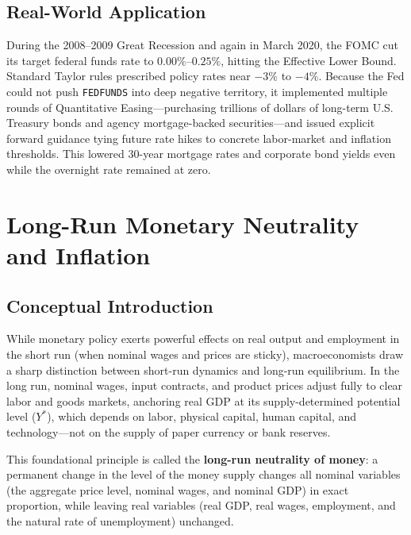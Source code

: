 \documentclass[11pt, a4paper]{article}
\begin{document}
\subsection*{Real-World Application}
During the 2008--2009 Great Recession and again in March 2020, the FOMC cut its target federal funds rate to $0.00\%$--$0.25\%$, hitting the Effective Lower Bound. Standard Taylor rules prescribed policy rates near $-3\%$ to $-4\%$. Because the Fed could not push \texttt{FEDFUNDS} into deep negative territory, it implemented multiple rounds of Quantitative Easing---purchasing trillions of dollars of long-term U.S. Treasury bonds and agency mortgage-backed securities---and issued explicit forward guidance tying future rate hikes to concrete labor-market and inflation thresholds. This lowered $30$-year mortgage rates and corporate bond yields even while the overnight rate remained at zero.

\section{Long-Run Monetary Neutrality and Inflation}

\subsection*{Conceptual Introduction}
While monetary policy exerts powerful effects on real output and employment in the short run (when nominal wages and prices are sticky), macroeconomists draw a sharp distinction between short-run dynamics and long-run equilibrium. In the long run, nominal wages, input contracts, and product prices adjust fully to clear labor and goods markets, anchoring real GDP at its supply-determined potential level ($Y^*$), which depends on labor, physical capital, human capital, and technology---not on the supply of paper currency or bank reserves.

This foundational principle is called the \textbf{long-run neutrality of money}: a permanent change in the level of the money supply changes all nominal variables (the aggregate price level, nominal wages, and nominal GDP) in exact proportion, while leaving real variables (real GDP, real wages, employment, and the natural rate of unemployment) unchanged.
\end{document}
